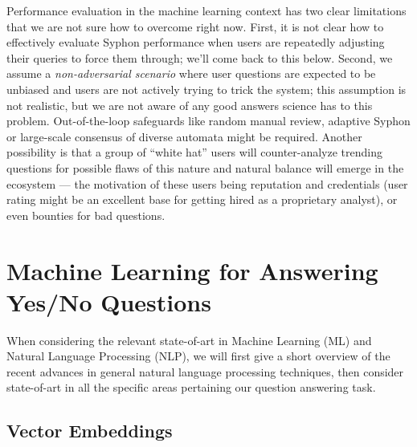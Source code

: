 \documentclass[11pt,a4paper]{article}
\begin{document}
Performance evaluation in the machine learning context has two clear limitations
that we are not sure how to overcome right now.  First, it is not clear how to
effectively evaluate Syphon performance when users are repeatedly adjusting
their queries to force them through; we'll come back to this below.
Second, we assume a \textit{non-adversarial scenario} where user questions
are expected to be unbiased and users are not actively trying to trick the system;
this assumption is not realistic, but we are not aware of any good answers science
has to this problem.  Out-of-the-loop safeguards like random manual review,
adaptive Syphon or large-scale consensus of diverse automata might be required.
Another possibility is that a group of ``white hat'' users will counter-analyze
trending questions for possible flaws of this nature and natural balance will
emerge in the ecosystem --- the motivation of these users being reputation and
credentials (user rating might be an excellent base for getting hired as a
proprietary analyst), or even bounties for bad questions.

\section{Machine Learning for Answering Yes/No Questions}
\label{ynml}

When considering the relevant state-of-art in Machine Learning (ML) and
Natural Language Processing (NLP), we will first give a short overview
of the recent advances in general natural language processing techniques,
then consider state-of-art in all the specific areas pertaining our question
answering task.

\subsection{Vector Embeddings}
\end{document}
